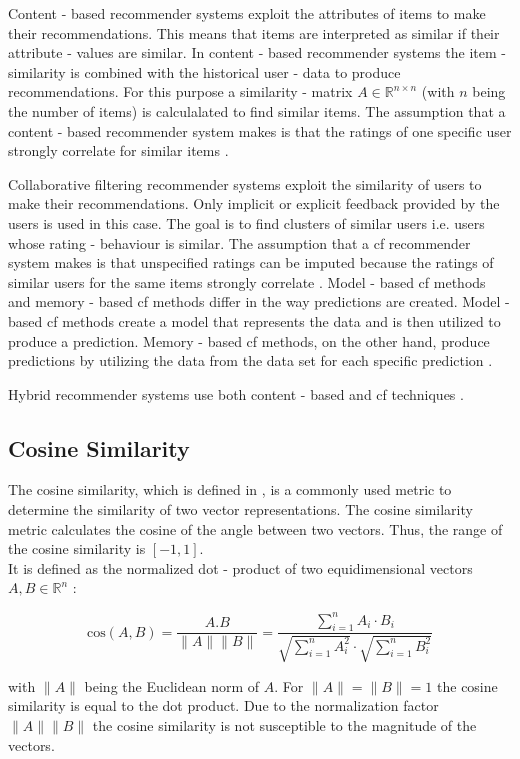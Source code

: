 \noindent Content - based recommender systems exploit the attributes of items to make their recommendations.
This means that items are interpreted as similar if their attribute - values are similar. 
In content - based recommender systems the item - similarity is combined with the historical user - data to produce recommendations.
For this purpose a similarity - matrix ${A} \in \mathbb{R}^{n \times n}$ (with $n$ being the number of items) is calculalated to find
similar items. The assumption that a content - based recommender system makes is that the ratings of one specific user strongly
correlate for similar items \cite{aggarwal2016recommender}. 

\noindent Collaborative filtering recommender systems exploit the similarity of users to make their recommendations. Only
implicit or explicit feedback provided by the users is used in this case. The goal is to find clusters of similar users i.e.
users whose rating - behaviour is similar. The assumption that a \acrshort{cf} recommender system makes is that
unspecified ratings can be imputed because the ratings of similar users for the same items strongly correlate \cite{aggarwal2016recommender}.
Model - based \acrshort{cf} methods and memory - based \acrshort{cf} methods differ in the way predictions are created. Model - based \acrshort{cf} methods create a model that represents the data and is then utilized to produce a prediction. Memory - based \acrshort{cf} methods, on the other hand, produce predictions by utilizing the data from the data set for each specific prediction \cite{aggarwal2016recommender}. 

\noindent Hybrid recommender systems use both content - based and \acrshort{cf} techniques \cite{lu2012recommender}. 

\subsection{Cosine Similarity}
The cosine similarity, which is defined in \cite{xia2015learning}, is a commonly used metric to determine the similarity of two vector representations. The cosine similarity metric calculates the cosine of the angle between two vectors. Thus, the range of the cosine similarity is $[-1, 1]$.\\
It is defined as the normalized dot - product of two equidimensional vectors $A, B \in \mathbb{R}^{n}$ \cite{xia2015learning}:
\begin{center}
\begin{equation}
    \text{cos}(A, B) = \frac{A.B}{\|A\|\|B\|} = \frac{\sum_{i=1}^{n}A_i \cdot B_i}{\sqrt{\sum_{i=1}^{n}A_i^{2}} \cdot \sqrt{\sum_{i=1}^{n}B_i^{2}}}
\end{equation}
\end{center}
with $\|A\|$ being the Euclidean norm of $A$. For $\|A\| = \|B\| = 1$ the cosine similarity is equal to the dot product. Due to the normalization factor $\|A\|\|B\|$ the cosine similarity is not susceptible to the magnitude of the vectors.

